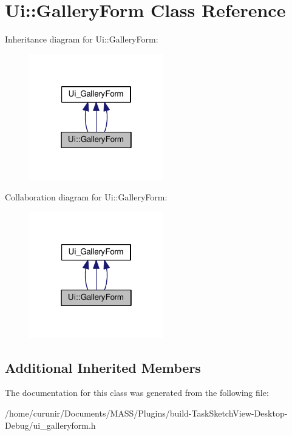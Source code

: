 \hypertarget{class_ui_1_1_gallery_form}{}\section{Ui\+:\+:Gallery\+Form Class Reference}
\label{class_ui_1_1_gallery_form}


Inheritance diagram for Ui\+:\+:Gallery\+Form\+:
\nopagebreak
\begin{figure}[H]
\begin{center}
\leavevmode
\includegraphics[width=166pt]{class_ui_1_1_gallery_form__inherit__graph}
\end{center}
\end{figure}


Collaboration diagram for Ui\+:\+:Gallery\+Form\+:
\nopagebreak
\begin{figure}[H]
\begin{center}
\leavevmode
\includegraphics[width=166pt]{class_ui_1_1_gallery_form__coll__graph}
\end{center}
\end{figure}
\subsection*{Additional Inherited Members}


The documentation for this class was generated from the following file\+:\begin{DoxyCompactItemize}
\item 
/home/curunir/\+Documents/\+M\+A\+S\+S/\+Plugins/build-\/\+Task\+Sketch\+View-\/\+Desktop-\/\+Debug/ui\+\_\+galleryform.\+h\end{DoxyCompactItemize}
